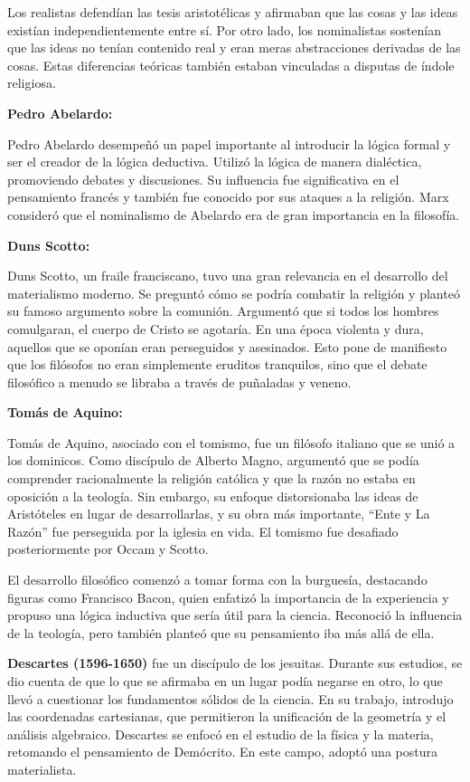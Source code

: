 \documentclass[
  a4paper,
]{article}
\begin{document}
Los realistas defendían las tesis aristotélicas y afirmaban que las
cosas y las ideas existían independientemente entre sí. Por otro lado,
los nominalistas sostenían que las ideas no tenían contenido real y eran
meras abstracciones derivadas de las cosas. Estas diferencias teóricas
también estaban vinculadas a disputas de índole religiosa.

\textbf{Pedro Abelardo:}

Pedro Abelardo desempeñó un papel importante al introducir la lógica
formal y ser el creador de la lógica deductiva. Utilizó la lógica de
manera dialéctica, promoviendo debates y discusiones. Su influencia fue
significativa en el pensamiento francés y también fue conocido por sus
ataques a la religión. Marx consideró que el nominalismo de Abelardo era
de gran importancia en la filosofía.

\textbf{Duns Scotto:}

Duns Scotto, un fraile franciscano, tuvo una gran relevancia en el
desarrollo del materialismo moderno. Se preguntó cómo se podría combatir
la religión y planteó su famoso argumento sobre la comunión. Argumentó
que si todos los hombres comulgaran, el cuerpo de Cristo se agotaría. En
una época violenta y dura, aquellos que se oponían eran perseguidos y
asesinados. Esto pone de manifiesto que los filósofos no eran
simplemente eruditos tranquilos, sino que el debate filosófico a menudo
se libraba a través de puñaladas y veneno.

\textbf{Tomás de Aquino:}

Tomás de Aquino, asociado con el tomismo, fue un filósofo italiano que
se unió a los dominicos. Como discípulo de Alberto Magno, argumentó que
se podía comprender racionalmente la religión católica y que la razón no
estaba en oposición a la teología. Sin embargo, su enfoque distorsionaba
las ideas de Aristóteles en lugar de desarrollarlas, y su obra más
importante, ``Ente y La Razón'' fue perseguida por la iglesia en vida.
El tomismo fue desafiado posteriormente por Occam y Scotto.

El desarrollo filosófico comenzó a tomar forma con la burguesía,
destacando figuras como Francisco Bacon, quien enfatizó la importancia
de la experiencia y propuso una lógica inductiva que sería útil para la
ciencia. Reconoció la influencia de la teología, pero también planteó
que su pensamiento iba más allá de ella.

\textbf{Descartes (1596-1650)} fue un discípulo de los jesuitas. Durante
sus estudios, se dio cuenta de que lo que se afirmaba en un lugar podía
negarse en otro, lo que llevó a cuestionar los fundamentos sólidos de la
ciencia. En su trabajo, introdujo las coordenadas cartesianas, que
permitieron la unificación de la geometría y el análisis algebraico.
Descartes se enfocó en el estudio de la física y la materia, retomando
el pensamiento de Demócrito. En este campo, adoptó una postura
materialista.
\end{document}
